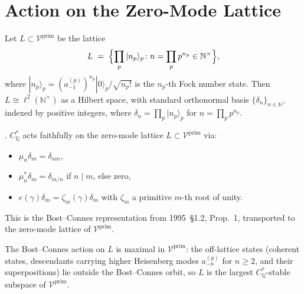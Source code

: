 \section{Action on the Zero-Mode Lattice}
\label{v4-arith:cs:zero-mode-action}

\begin{definition}
\label{v4-arith:def:zero-mode-lattice}
Let \(L\subset\mathcal{V}^{\mathrm{prim}}\) be the lattice
\begin{equation}
L\;=\;\Bigl\{\prod_{p}|n_{p}\rangle_{p}\colon n=\prod_{p}p^{n_{p}}\in\mathbb{N}^{\times}\Bigr\},
\end{equation}
where \(|n_{p}\rangle_{p}=(a^{(p)}_{-1})^{n_{p}}|0\rangle_{p}/\sqrt{n_{p}!}\)
is the \(n_{p}\)-th Fock number state. Then \(L\cong\ell^{2}(\mathbb{N}^{\times})\)
as a Hilbert space, with standard orthonormal basis
\(\{\delta_{n}\}_{n\in\mathbb{N}^{\times}}\) indexed by positive integers,
where \(\delta_{n}=\prod_{p}|n_{p}\rangle_{p}\) for
\(n=\prod_{p}p^{n_{p}}\).
\end{definition}

\begin{theorem}
\label{v4-arith:thm:BC-acts-on-L}
\ClaimStatusProvedHere. \(C_{\mathbb{Q}}^{*}\) acts faithfully on
the zero-mode lattice \(L\subset\mathcal{V}^{\mathrm{prim}}\) via:
\begin{itemize}
\item \(\mu_{n}\delta_{m}=\delta_{nm}\),
\item \(\mu_{n}^{*}\delta_{m}=\delta_{m/n}\) if \(n\mid m\), else zero,
\item \(e(\gamma)\delta_{m}=\zeta_{m}(\gamma)\delta_{m}\) with
\(\zeta_{m}\) a primitive \(m\)-th root of unity.
\end{itemize}
This is the Bost--Connes representation from 1995~\S1.2, Prop.~1,
transported to the zero-mode lattice of \(\mathcal{V}^{\mathrm{prim}}\).
\end{theorem}

\begin{observation}
\label{v4-arith:obs:zero-mode-action-maximal}
The Bost--Connes action on \(L\) is maximal in \(\mathcal{V}^{\mathrm{prim}}\):
the off-lattice states (coherent states, descendants carrying
higher Heisenberg modes \(a^{(p)}_{-n}\) for \(n \geq 2\), and their
superpositions) lie outside the Bost--Connes orbit, so \(L\) is
the largest \(C^{*}_{\mathbb{Q}}\)-stable subspace of
\(\mathcal{V}^{\mathrm{prim}}\).
\end{observation}

